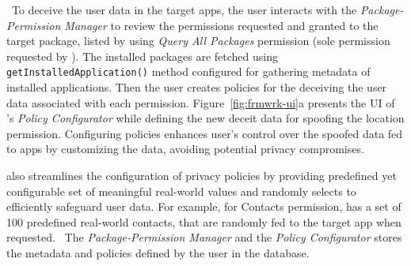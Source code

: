 ~To deceive the user data in the target apps, the user interacts with the \textit{Package-Permission Manager} to review the permissions requested and granted to the target package, listed by \framework{} using \textit{Query All Packages} permission (sole permission requested by \framework{}). The installed packages are fetched using \texttt{getInstalledApplication()} method configured for gathering metadata of installed applications. Then the user creates policies for the deceiving the user data associated with each permission. Figure~\ref{fig:frmwrk-ui}a presents the UI of \framework{}'s \textit{Policy Configurator} while defining the new deceit data for spoofing the location permission. Configuring policies enhances user's control over the spoofed data fed to apps by customizing the data, avoiding potential privacy compromises. 

\framework{} also streamlines the configuration of privacy policies by providing predefined 
yet configurable set of meaningful real-world values and randomly selects to efficiently safeguard user data. For example, for Contacts permission, \framework{} has a set of 100 predefined real-world contacts, that are randomly fed to the target app when requested. ~The \textit{Package-Permission Manager} and the \textit{Policy Configurator} stores the metadata and policies defined by the user in the database. 



 


